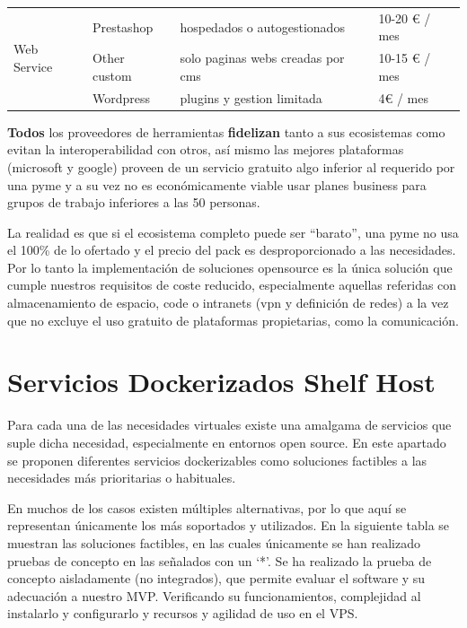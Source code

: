 \begin{center}
\begin{longtable}[!ht]{|p{3.25cm}|p{3.25cm}|p{3.25cm}|p{3.25cm}|}
\multicolumn{1}{|p{3.25cm}|}{\multirow{3}{4em}{Web Service}} &
  \multicolumn{1}{p{3.25cm}|}{Prestashop\cite{c_prestashop}} &
  \multicolumn{1}{p{3.25cm}|}{hospedados o autogestionados} &
  \multicolumn{1}{p{3.25cm}|}{10-20 € / mes} \\ \cline{2-4} 
\multicolumn{1}{|p{3.25cm}|}{} &
  \multicolumn{1}{p{3.25cm}|}{Other custom} &
  \multicolumn{1}{p{3.25cm}|}{solo paginas webs creadas por cms} &
  \multicolumn{1}{p{3.25cm}|}{10-15 € / mes} \\ \cline{2-4} 
\multicolumn{1}{|p{3.25cm}|}{} &
  \multicolumn{1}{p{3.25cm}|}{Wordpress\cite{c_wordpress}} &
  \multicolumn{1}{p{3.25cm}|}{plugins y gestion limitada} &
  \multicolumn{1}{p{3.25cm}|}{4€ / mes} \\ \hline        
\end{longtable}
\end{center}

\textbf{Todos} los proveedores de herramientas \textbf{fidelizan} tanto a sus ecosistemas como evitan la interoperabilidad con otros, así mismo las mejores plataformas (microsoft y google) proveen de un servicio gratuito algo inferior al requerido por una pyme y a su vez no es económicamente viable usar planes business para grupos de trabajo inferiores a las 50 personas.

 La realidad es que si el ecosistema completo puede ser “barato”, una pyme no usa el 100\% de lo ofertado y el precio del pack es desproporcionado a las necesidades. Por lo tanto la implementación de soluciones opensource es la única solución que cumple nuestros requisitos de coste reducido, especialmente aquellas referidas con almacenamiento de espacio, code o intranets (vpn y definición de redes) a la vez que no excluye el uso gratuito de plataformas propietarias, como la comunicación.

\section{Servicios Dockerizados Shelf Host}
Para cada una de las necesidades virtuales existe una amalgama de servicios que suple dicha necesidad, especialmente en entornos open source. En este apartado se proponen diferentes servicios dockerizables como soluciones factibles a las necesidades más prioritarias o habituales.

En muchos de los casos existen múltiples alternativas, por lo que aquí se representan únicamente los más soportados y utilizados. En la siguiente tabla se muestran las soluciones factibles, en las cuales únicamente se han realizado pruebas de concepto en las señalados con un ‘*’. Se ha realizado la prueba de concepto aisladamente (no integrados), que permite evaluar el software y su adecuación a nuestro MVP. Verificando su funcionamientos, complejidad al instalarlo y configurarlo y recursos y agilidad de uso en el VPS.


